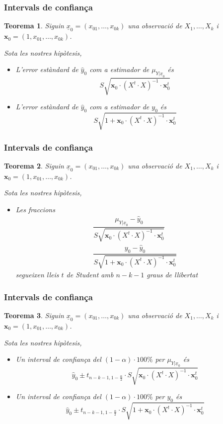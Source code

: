 \documentclass[12pt,t]{beamer}
\theoremstyle{plain}
\newtheorem{teorema}{Teorema}
\theoremstyle{definition}
\begin{document}
\begin{frame}
\frametitle{Intervals de confiança}
\begin{teorema}
Siguin $\underline{x}_0=(x_{01},\ldots,x_{0k})$ una observació de $X_1,\ldots,X_k$ i $\mathbf{x}_0=(1,x_{01},\ldots,x_{0k})$. 

Sota les nostres hipòtesis, 
\begin{itemize}
\item L'error estàndard de $\widehat{y}_0$ com a estimador de $\mu_{Y|\underline{x}_0}$ és 
$$
S\sqrt{\mathbf{x}_0\cdot  (X^t \cdot  X)^{-1}\cdot \mathbf{x}_0^t}
$$

\item L'error estàndard de $\widehat{y}_0$ com a estimador de $y_0$ és 
$$
S\sqrt{1+\mathbf{x}_0\cdot  (X^t \cdot  X)^{-1}\cdot \mathbf{x}_0^t}
$$
\end{itemize}
\end{teorema}
\end{frame}


\begin{frame}
\frametitle{Intervals de confiança}
\begin{teorema}
Siguin $\underline{x}_0=(x_{01},\ldots,x_{0k})$ una observació de $X_1,\ldots,X_k$ i $\mathbf{x}_0=(1,x_{01},\ldots,x_{0k})$. 

Sota les nostres hipòtesis, 
\begin{itemize}
\item Les fraccions 
$$
\begin{array}{l}
\dfrac{\mu_{Y|\underline{x}_0}-\widehat{y}_0}{S\sqrt{\mathbf{x}_0\cdot (X^t \cdot X)^{-1}\cdot \mathbf{x}_0^t}}\\[3ex]
\dfrac{y_0-\widehat{y}_0}{S\sqrt{1+\mathbf{x}_0\cdot  (X^t \cdot X)^{-1}\cdot \mathbf{x}_0^t}}
\end{array}
$$
segueixen lleis $t$ de Student amb $n-k-1$ graus de llibertat
\end{itemize}
\end{teorema}
\end{frame}


\begin{frame}
\frametitle{Intervals de confiança}
\begin{teorema}
Siguin $\underline{x}_0=(x_{01},\ldots,x_{0k})$ una observació de $X_1,\ldots,X_k$ i $\mathbf{x}_0=(1,x_{01},\ldots,x_{0k})$. 

Sota les nostres hipòtesis, 
\begin{itemize}

\item Un interval de confiança del $(1-\alpha)\cdot 100\%$ per $\mu_{Y|\underline{x}_0}$ és
$$
\widehat{y}_0\pm t_{n-k-1,1-\frac{\alpha}{2}}\cdot S\sqrt{\mathbf{x}_0\cdot(X^t  \cdot X)^{-1}\cdot \mathbf{x}_0^t}
$$
\medskip

\item Un interval de confiança del $(1-\alpha)\cdot 100\%$ per $y_0$ és
$$
\widehat{y}_0\pm t_{n-k-1,1-\frac{\alpha}{2}}\cdot S\sqrt{1+\mathbf{x}_0\cdot(X^t  \cdot X)^{-1}\cdot \mathbf{x}_0^t}
$$
\end{itemize}
\end{teorema}
\end{frame}
\end{document}
